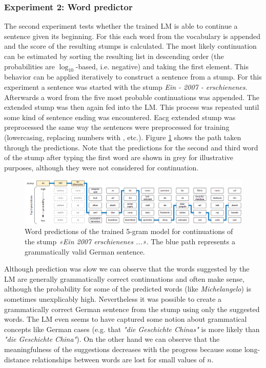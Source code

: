\subsubsection{Experiment 2: Word predictor}

The second experiment tests whether the trained \ac{LM} is able to continue a sentence given its beginning. For this each word from the vocabulary is appended and the score of the resulting stumps is calculated. The most likely continuation can be estimated by sorting the resulting list in descending order (the probabilities are $\log_10$-based, i.e. negative) and taking the first element. This behavior can be applied iteratively to construct a sentence from a stump. For this experiment a sentence was started with the stump \textit{Ein - 2007 - erschienenes}. Afterwards a word from the five most probable continuations was appended. The extended stump was then again fed into the \ac{LM}. This process was repeated until some kind of sentence ending was encountered. Eacg extended stump was preprocessed the same way the sentences were preprocessed for training (lowercasing, replacing numbers with , etc.). Figure \ref{word_predictor} shows the path taken through the predictions. Note that the predictions for the second and third word of the stump after typing the first word are shown in grey for illustrative purposes, although they were not considered for continuation.

\begin{figure}
	\includegraphics[width=\linewidth]{./img/word_predictor.png}
	\caption{Word predictions of the trained 5-gram model for continuations of the stump \textit{«Ein 2007 erschienenes ...»}. The blue path represents a grammatically valid German sentence.}
	\label{word_predictor}
\end{figure}

Although prediction was slow we can observe that the words suggested by the \ac{LM} are generally grammatically correct continuations and often make sense, although the probability for some of the predicted words (like \textit{Michelangelo}) is sometimes unexplicably high. Nevertheless it was possible to create a grammatically correct German sentence from the stump using only the suggested words. The \ac{LM} even seems to have captured some notion about grammatical concepts like German cases (e.g. that \textit{"die Geschichte Chinas"} is more likely than \textit{"die Geschichte China"}). On the other hand we can observe that the meaningfulness of the suggestions decreases with the progress because some long-distance relationships between words are lost for small values of $n$.

